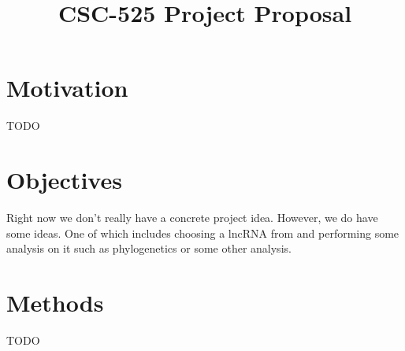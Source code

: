 \documentclass[conference]{IEEEtran}
\begin{document}

\title{CSC-525 Project Proposal}

\author{
}

\maketitle

\section{Motivation}

TODO

\section{Objectives}

Right now we don't really have a concrete project idea. However, we do have some ideas. One of which includes choosing a lncRNA from \cite{luo2016long} and performing some analysis on it such as phylogenetics or some other analysis.

\section{Methods}

TODO



\end{document}
